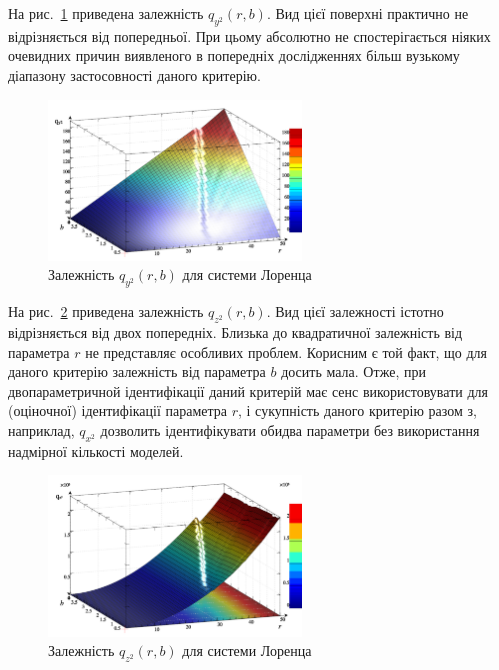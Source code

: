 На рис.~\ref{atu:f:lor_qy2_r_b} приведена залежність
$q_{y^2} (r, b) $. Вид цієї поверхні практично не відрізняється від
попередньої. При цьому абсолютно не спостерігається ніяких
очевидних причин виявленого в попередніх дослідженнях більш
вузькому діапазону застосовності даного критерію.

\begin{figure}[htb!]
  \begin{center}
    \includegraphics[width=0.60\textwidth]{p/cha/lor/q2d/lor_qy2_r_b.png}
  \end{center}
  \caption{Залежність $q_{y^2}(r,b)$ для системи Лоренца}
  \label{atu:f:lor_qy2_r_b}
\end{figure}

На рис.~\ref{atu:f:lor_qz2_r_b} приведена залежність
$q_{z^2}(r,b)$.
Вид цієї залежності істотно відрізняється від двох попередніх.
Близька до квадратичної залежність від параметра $r$ не представляє особливих
проблем. Корисним є той факт, що для даного критерію залежність від параметра $b$
досить мала. Отже, при двопараметричной ідентифікації даний критерій має
сенс використовувати для (оціночної) ідентифікації параметра $r$, і
сукупність даного критерію разом з, наприклад, $q_{x^2}$ дозволить
ідентифікувати обидва параметри без використання надмірної кількості моделей.

\begin{figure}[htb!]
  \begin{center}
    \includegraphics[width=0.60\textwidth]{p/cha/lor/q2d/lor_qz2_r_b.png}
  \end{center}
  \caption{Залежність $q_{z^2}(r,b)$ для системи Лоренца}
  \label{atu:f:lor_qz2_r_b}
\end{figure}

